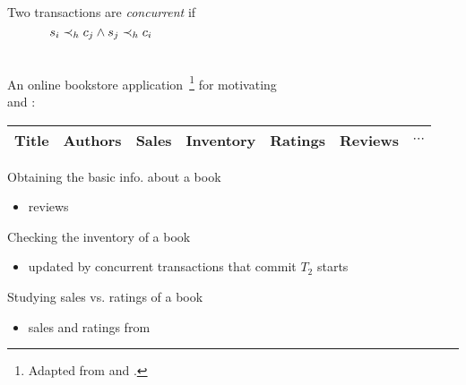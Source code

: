 \appendix

\begin{frame}{}
  \begin{columns}
      Two transactions are \emph{concurrent} if
      \[
	s_i \prec_{h} c_j \land s_j \prec_{h} c_i
      \]
  \end{columns}
\end{frame}

\begin{frame}{}
  \resizebox{1.00\textwidth}{!}{}
\end{frame}

\begin{frame}{}
  \begin{center}
    An online bookstore application~\footnote{Adapted from  
    and .} for motivating \\
     and :
  \end{center}

  \vspace{-0.20cm}
  \begin{table}
    \centering
    \begin{tabular}{c|c|c|c|c|c|c}
      \hline
      Title & Authors & Sales & Inventory & Ratings & Reviews & $\cdots$ \\
      \hline
    \end{tabular}
  \end{table}

  \vspace{0.20cm}
  \begin{description}
    \setlength{\itemsep}{6pt}
    \item[Customer ($T_1$):] Obtaining the basic info. about a book
      \begin{itemize}
	\item \emph{} reviews
      \end{itemize}
      \pause
    \item[Bookstore Clerk ($T_2$):] Checking the inventory of a book
      \begin{itemize}
	\item updated by concurrent transactions that commit \emph{} $T_2$ starts
      \end{itemize}
      \pause
    \item[Sales Analyst ($T_3$):] Studying sales vs. ratings of a book
      \begin{itemize}
	\item sales and ratings from \emph{}
      \end{itemize}
  \end{description}
\end{frame}

